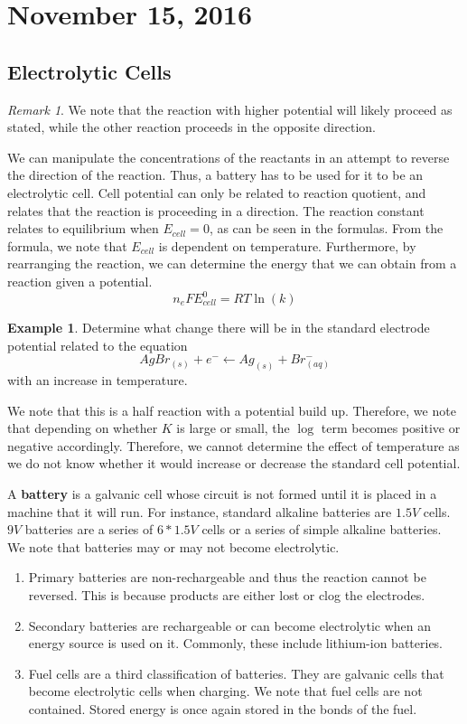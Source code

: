 \documentclass[11pt]{article}
\theoremstyle{plain} %
\theoremstyle{definition}
\theoremstyle{example}
\newtheorem*{example}{Example}
\theoremstyle{remark}
\newtheorem*{remark}{Remark}
\begin{document}
\section{November 15, 2016}
\subsection{Electrolytic Cells}

\begin{remark}We note that the reaction with higher potential will likely proceed as stated, while the other reaction proceeds in the opposite direction. 
\end{remark}

We can manipulate the concentrations of the reactants in an attempt to reverse the direction of the reaction. Thus, a battery has to be used for it to be an electrolytic cell. Cell potential can only be related to reaction quotient, and relates that the reaction is proceeding in a direction. The reaction constant relates to equilibrium
when $E_{cell}=0$, as can be seen in the formulas. From the formula, we note that $E_{cell}$ is dependent on temperature. Furthermore, by rearranging the reaction, we can determine the energy that we can obtain from a reaction given a potential. $$n_eFE_{cell}^0 = RT\ln(k)$$

\begin{example}
Determine what change there will be in the standard electrode potential related to the equation $$AgBr_{(s)} + e^- \leftarrow  Ag_{(s)} + Br^-_{(aq)}$$ with an increase in temperature.
\end{example}

We note that this is a half reaction with a potential build up. Therefore, we note that depending on whether $K$ is large or small, the $\log$ term becomes positive or negative accordingly. Therefore, we cannot determine the effect of temperature as we do not know whether it would increase or decrease the standard cell potential. 


A \textbf{battery} is a galvanic cell whose circuit is not formed until it is placed in a machine that it will run. For instance, standard alkaline batteries are $1.5V$ cells. $9V$ batteries are a series of $6*1.5V$ cells or a series of simple alkaline batteries. We note that batteries may or may not become electrolytic. 

\begin{enumerate}
	\item Primary batteries are non-rechargeable and thus the reaction cannot be reversed. This is because products are either lost or clog the electrodes. 
	\item Secondary batteries are rechargeable or can become electrolytic when an energy source is used on it. Commonly, these include lithium-ion batteries. 
	\item Fuel cells are a third classification of batteries. They are galvanic cells that become electrolytic cells when charging. We note that fuel cells are not contained. Stored energy is once again stored in the bonds of the fuel. 
\end{enumerate}
\end{document}
